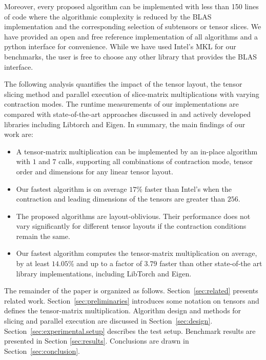 Moreover, every proposed algorithm can be implemented with less than 150 lines of  code where the algorithmic complexity is reduced by the BLAS implementation and the corresponding selection of subtensors or tensor slices.
We have provided an open and free reference  implementation of all algorithms and a python interface for convenience.
While we have used Intel's MKL for our benchmarks, the user is free to choose any other library that provides the BLAS interface.

The following analysis quantifies the impact of the tensor layout, the tensor slicing method and parallel execution of slice-matrix multiplications with varying contraction modes.
The runtime measurements of our implementations are compared with state-of-the-art approaches discussed in \cite{springer:2018:design, matthews:2018:high} and actively developed libraries including Libtorch and Eigen. In summary, the main findings of our work are:
\begin{itemize}
	\item 
	A tensor-matrix multiplication can be implemented by an in-place algorithm with $1$  and $7$  calls, supporting all combinations of contraction mode, tensor order and dimensions for any linear tensor layout.
	\item 
	Our fastest algorithm is on average $17$\% faster than Intel's  when the contraction and leading dimensions of the tensors are greater than $256$.
	\item 
	The proposed algorithms are layout-oblivious. 
	Their performance does not vary significantly for different tensor layouts if the contraction conditions remain the same.
	\item
	Our fastest algorithm computes the tensor-matrix multiplication on average, by at least $14.05$\% and up to a factor of $3.79$ faster than other state-of-the art library implementations, including LibTorch and Eigen.
\end{itemize}

The remainder of the paper is organized as follows. 
Section~\ref{sec:related} presents related work.
Section~\ref{sec:preliminaries} introduces some notation on tensors and defines the tensor-matrix multiplication.
Algorithm design and methods for slicing and parallel execution are discussed in Section~\ref{sec:design}.
Section~\ref{sec:experimental.setup} describes the test setup. Benchmark results are presented in Section \ref{sec:results}.
Conclusions are drawn in Section~\ref{sec:conclusion}.